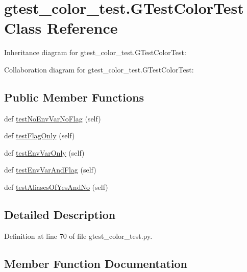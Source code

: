 \hypertarget{classgtest__color__test_1_1_g_test_color_test}{}\section{gtest\+\_\+color\+\_\+test.\+G\+Test\+Color\+Test Class Reference}
\label{classgtest__color__test_1_1_g_test_color_test}


Inheritance diagram for gtest\+\_\+color\+\_\+test.\+G\+Test\+Color\+Test\+:


Collaboration diagram for gtest\+\_\+color\+\_\+test.\+G\+Test\+Color\+Test\+:
\subsection*{Public Member Functions}
\begin{DoxyCompactItemize}
\item 
def \hyperlink{classgtest__color__test_1_1_g_test_color_test_a22bf83ab416dc3ccd3c1b771ff74022c}{test\+No\+Env\+Var\+No\+Flag} (self)
\item 
def \hyperlink{classgtest__color__test_1_1_g_test_color_test_abc4c056b8e703e83516f9e5aea8dd25d}{test\+Flag\+Only} (self)
\item 
def \hyperlink{classgtest__color__test_1_1_g_test_color_test_aedb7bbaa0d6acff3628d91a471f4ceb5}{test\+Env\+Var\+Only} (self)
\item 
def \hyperlink{classgtest__color__test_1_1_g_test_color_test_ae88e8ec526135ed1448e83fc4ec7cd15}{test\+Env\+Var\+And\+Flag} (self)
\item 
def \hyperlink{classgtest__color__test_1_1_g_test_color_test_aaf2110e359494dc711e87d29d351dc47}{test\+Aliases\+Of\+Yes\+And\+No} (self)
\end{DoxyCompactItemize}


\subsection{Detailed Description}


Definition at line 70 of file gtest\+\_\+color\+\_\+test.\+py.



\subsection{Member Function Documentation}
